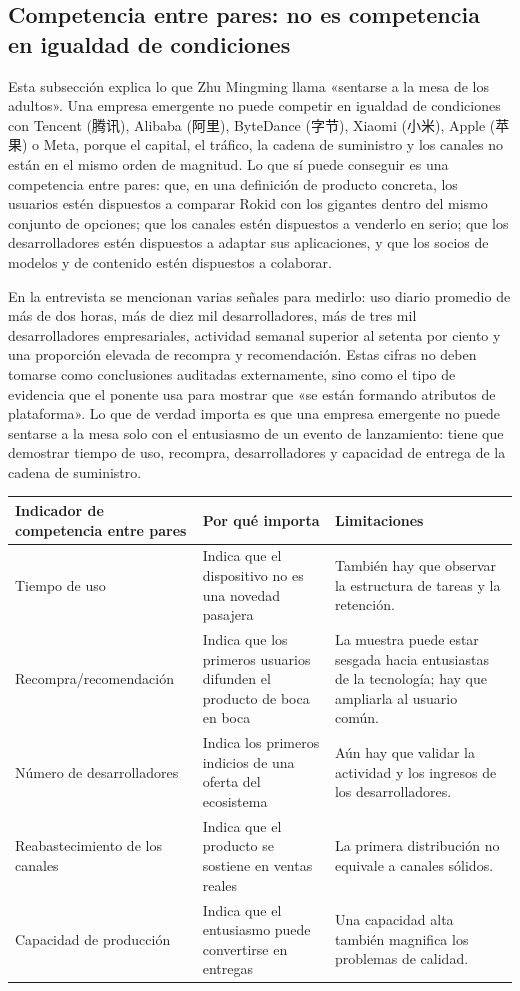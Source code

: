 \documentclass[a4paper]{article}
\begin{document}
\subsection{Competencia entre pares: no es competencia en igualdad de condiciones}

Esta subsección explica lo que Zhu Mingming llama «sentarse a la mesa de los adultos». Una empresa emergente no puede competir en igualdad de condiciones con Tencent (腾讯), Alibaba (阿里), ByteDance (字节), Xiaomi (小米), Apple (苹果) o Meta, porque el capital, el tráfico, la cadena de suministro y los canales no están en el mismo orden de magnitud. Lo que sí puede conseguir es una competencia entre pares: que, en una definición de producto concreta, los usuarios estén dispuestos a comparar Rokid con los gigantes dentro del mismo conjunto de opciones; que los canales estén dispuestos a venderlo en serio; que los desarrolladores estén dispuestos a adaptar sus aplicaciones, y que los socios de modelos y de contenido estén dispuestos a colaborar.

En la entrevista se mencionan varias señales para medirlo: uso diario promedio de más de dos horas, más de diez mil desarrolladores, más de tres mil desarrolladores empresariales, actividad semanal superior al setenta por ciento y una proporción elevada de recompra y recomendación. Estas cifras no deben tomarse como conclusiones auditadas externamente, sino como el tipo de evidencia que el ponente usa para mostrar que «se están formando atributos de plataforma». Lo que de verdad importa es que una empresa emergente no puede sentarse a la mesa solo con el entusiasmo de un evento de lanzamiento: tiene que demostrar tiempo de uso, recompra, desarrolladores y capacidad de entrega de la cadena de suministro.

\noindent\begin{tabularx}{\textwidth}{p{}p{}X}
\toprule
Indicador de competencia entre pares & Por qué importa & Limitaciones \\
\midrule
Tiempo de uso & Indica que el dispositivo no es una novedad pasajera & También hay que observar la estructura de tareas y la retención. \\
Recompra/recomendación & Indica que los primeros usuarios difunden el producto de boca en boca & La muestra puede estar sesgada hacia entusiastas de la tecnología; hay que ampliarla al usuario común. \\
Número de desarrolladores & Indica los primeros indicios de una oferta del ecosistema & Aún hay que validar la actividad y los ingresos de los desarrolladores. \\
Reabastecimiento de los canales & Indica que el producto se sostiene en ventas reales & La primera distribución no equivale a canales sólidos. \\
Capacidad de producción & Indica que el entusiasmo puede convertirse en entregas & Una capacidad alta también magnifica los problemas de calidad. \\
\bottomrule
\end{tabularx}
\end{document}
